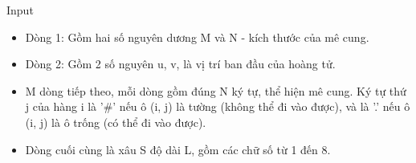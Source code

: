 Input
\begin{itemize}
	\item Dòng 1: Gồm hai số nguyên dương M và N - kích thước của mê cung.
	\item Dòng 2: Gồm 2 số nguyên u, v, là vị trí ban đầu của hoàng tử.
	\item M dòng tiếp theo, mỗi dòng gồm đúng N ký tự, thể hiện mê cung. Ký tự thứ j của hàng i là '\#' nếu ô (i, j) là tường (không thể đi vào được), và là '.' nếu ô (i, j) là ô trống (có thể đi vào được).
	\item Dòng cuối cùng là xâu S độ dài L, gồm các chữ số từ 1 đến 8.
\end{itemize}